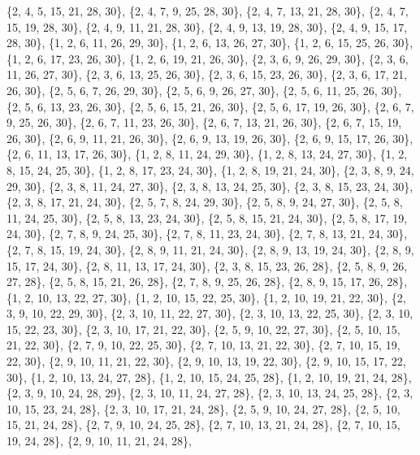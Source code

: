 \documentclass[11pt,a4paper]{article}
\begin{document}
{\{2, 4, 5, 15, 21, 28, 30\}, \{2, 4, 7, 9, 25, 28, 30\}, \{2, 4, 7, 13, 21, 28, 30\}, \{2, 4, 7, 15, 19, 28, 30\}, \{2, 4, 9, 11, 21, 28, 30\},
\{2, 4, 9, 13, 19, 28, 30\}, \{2, 4, 9, 15, 17, 28, 30\}, \{1, 2, 6, 11, 26, 29, 30\}, \{1, 2, 6, 13, 26, 27, 30\}, \{1, 2, 6, 15, 25, 26, 30\},
\{1, 2, 6, 17, 23, 26, 30\}, \{1, 2, 6, 19, 21, 26, 30\}, \{2, 3, 6, 9, 26, 29, 30\}, \{2, 3, 6, 11, 26, 27, 30\}, \{2, 3, 6, 13, 25, 26, 30\},
\{2, 3, 6, 15, 23, 26, 30\}, \{2, 3, 6, 17, 21, 26, 30\}, \{2, 5, 6, 7, 26, 29, 30\}, \{2, 5, 6, 9, 26, 27, 30\}, \{2, 5, 6, 11, 25, 26, 30\},
\{2, 5, 6, 13, 23, 26, 30\}, \{2, 5, 6, 15, 21, 26, 30\}, \{2, 5, 6, 17, 19, 26, 30\}, \{2, 6, 7, 9, 25, 26, 30\}, \{2, 6, 7, 11, 23, 26, 30\},
\{2, 6, 7, 13, 21, 26, 30\}, \{2, 6, 7, 15, 19, 26, 30\}, \{2, 6, 9, 11, 21, 26, 30\}, \{2, 6, 9, 13, 19, 26, 30\}, \{2, 6, 9, 15, 17, 26, 30\},
\{2, 6, 11, 13, 17, 26, 30\}, \{1, 2, 8, 11, 24, 29, 30\}, \{1, 2, 8, 13, 24, 27, 30\}, \{1, 2, 8, 15, 24, 25, 30\}, \{1, 2, 8, 17, 23, 24, 30\},
\{1, 2, 8, 19, 21, 24, 30\}, \{2, 3, 8, 9, 24, 29, 30\}, \{2, 3, 8, 11, 24, 27, 30\}, \{2, 3, 8, 13, 24, 25, 30\}, \{2, 3, 8, 15, 23, 24, 30\},
\{2, 3, 8, 17, 21, 24, 30\}, \{2, 5, 7, 8, 24, 29, 30\}, \{2, 5, 8, 9, 24, 27, 30\}, \{2, 5, 8, 11, 24, 25, 30\}, \{2, 5, 8, 13, 23, 24, 30\},
\{2, 5, 8, 15, 21, 24, 30\}, \{2, 5, 8, 17, 19, 24, 30\}, \{2, 7, 8, 9, 24, 25, 30\}, \{2, 7, 8, 11, 23, 24, 30\}, \{2, 7, 8, 13, 21, 24, 30\},
\{2, 7, 8, 15, 19, 24, 30\}, \{2, 8, 9, 11, 21, 24, 30\}, \{2, 8, 9, 13, 19, 24, 30\}, \{2, 8, 9, 15, 17, 24, 30\}, \{2, 8, 11, 13, 17, 24, 30\},
\{2, 3, 8, 15, 23, 26, 28\}, \{2, 5, 8, 9, 26, 27, 28\}, \{2, 5, 8, 15, 21, 26, 28\}, \{2, 7, 8, 9, 25, 26, 28\}, \{2, 8, 9, 15, 17, 26, 28\},
\{1, 2, 10, 13, 22, 27, 30\}, \{1, 2, 10, 15, 22, 25, 30\}, \{1, 2, 10, 19, 21, 22, 30\}, \{2, 3, 9, 10, 22, 29, 30\}, \{2, 3, 10, 11, 22, 27, 30\},
\{2, 3, 10, 13, 22, 25, 30\}, \{2, 3, 10, 15, 22, 23, 30\}, \{2, 3, 10, 17, 21, 22, 30\}, \{2, 5, 9, 10, 22, 27, 30\}, \{2, 5, 10, 15, 21, 22, 30\},
\{2, 7, 9, 10, 22, 25, 30\}, \{2, 7, 10, 13, 21, 22, 30\}, \{2, 7, 10, 15, 19, 22, 30\}, \{2, 9, 10, 11, 21, 22, 30\}, \{2, 9, 10, 13, 19, 22, 30\},
\{2, 9, 10, 15, 17, 22, 30\}, \{1, 2, 10, 13, 24, 27, 28\}, \{1, 2, 10, 15, 24, 25, 28\}, \{1, 2, 10, 19, 21, 24, 28\}, \{2, 3, 9, 10, 24, 28, 29\},
\{2, 3, 10, 11, 24, 27, 28\}, \{2, 3, 10, 13, 24, 25, 28\}, \{2, 3, 10, 15, 23, 24, 28\}, \{2, 3, 10, 17, 21, 24, 28\}, \{2, 5, 9, 10, 24, 27, 28\},
\{2, 5, 10, 15, 21, 24, 28\}, \{2, 7, 9, 10, 24, 25, 28\}, \{2, 7, 10, 13, 21, 24, 28\}, \{2, 7, 10, 15, 19, 24, 28\}, \{2, 9, 10, 11, 21, 24, 28\},
}
\end{document}
